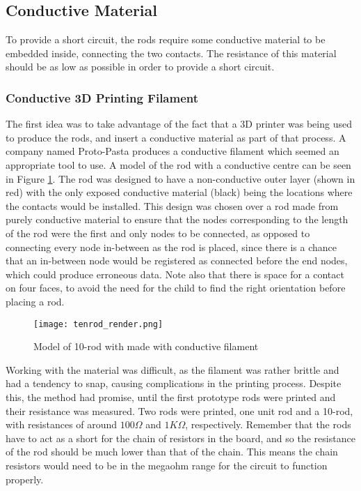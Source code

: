 \subsection{Conductive Material}
\label{sec:conductivematerial}
To provide a short circuit, the rods require some conductive material to be embedded inside, connecting the two contacts. The resistance of this material should be as low as possible in order to provide a short circuit.

\subsubsection{Conductive 3D Printing Filament}
The first idea was to take advantage of the fact that a 3D printer was being used to produce the rods, and insert a conductive material as part of that process. A company named Proto-Pasta produces a conductive filament \cite{Composit79:online} which seemed an appropriate tool to use. A model of the rod with a conductive centre can be seen in Figure \ref{fig:tenrodrender}. The rod was designed to have a non-conductive outer layer (shown in red) with the only exposed conductive material (black) being the locations where the contacts would be installed. This design was chosen over a rod made from purely conductive material to ensure that the nodes corresponding to the length of the rod were the first and only nodes to be connected, as opposed to connecting every node in-between as the rod is placed, since there is a chance that an in-between node would be registered as connected before the end nodes, which could produce erroneous data. Note also that there is space for a contact on four faces, to avoid the need for the child to find the right orientation before placing a rod.

\begin{figure}[H]
	\begin{center}
	\texttt{[image: tenrod\_render.png]}\\ 
  	\caption{Model of 10-rod with made with conductive filament}
    \label{fig:tenrodrender}
    \end{center}
\end{figure}


Working with the material was difficult, as the filament was rather brittle and had a tendency to snap, causing complications in the printing process. Despite this, the method had promise, until the first prototype rods were printed and their resistance was measured. Two rods were printed, one unit rod and a 10-rod, with resistances of around $100\Omega$ and $1K\Omega$, respectively. Remember that the rods have to act as a short for the chain of resistors in the board, and so the resistance of the rod should be much lower than that of the chain. This means the chain resistors would need to be in the megaohm range for the circuit to function properly. 

